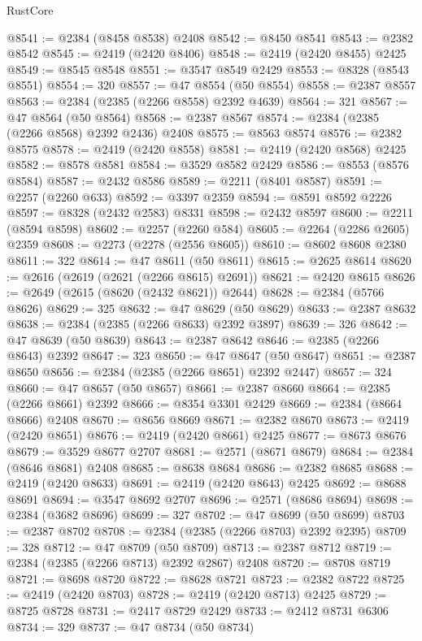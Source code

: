 \begin{lexlean}{RustCore}
\begin{coremodule}
@8541 := @2384 (@8458 @8538) @2408
@8542 := @8450 @8541
@8543 := @2382 @8542
@8545 := @2419 (@2420 @8406)
@8548 := @2419 (@2420 @8455) @2425
@8549 := @8545 @8548
@8551 := @3547 @8549 @2429
@8553 := @8328 (@8543 @8551)
@8554 := 320
@8557 := @47 @8554 (@50 @8554)
@8558 := @2387 @8557
@8563 := @2384 (@2385 (@2266 @8558) @2392 @4639)
@8564 := 321
@8567 := @47 @8564 (@50 @8564)
@8568 := @2387 @8567
@8574 := @2384 (@2385 (@2266 @8568) @2392 @2436) @2408
@8575 := @8563 @8574
@8576 := @2382 @8575
@8578 := @2419 (@2420 @8558)
@8581 := @2419 (@2420 @8568) @2425
@8582 := @8578 @8581
@8584 := @3529 @8582 @2429
@8586 := @8553 (@8576 @8584)
@8587 := @2432 @8586
@8589 := @2211 (@8401 @8587)
@8591 := @2257 (@2260 @633)
@8592 := @3397 @2359
@8594 := @8591 @8592 @2226
@8597 := @8328 (@2432 @2583) @8331
@8598 := @2432 @8597
@8600 := @2211 (@8594 @8598)
@8602 := @2257 (@2260 @584)
@8605 := @2264 (@2286 @2605) @2359
@8608 := @2273 (@2278 (@2556 @8605))
@8610 := @8602 @8608 @2380
@8611 := 322
@8614 := @47 @8611 (@50 @8611)
@8615 := @2625 @8614
@8620 := @2616 (@2619 (@2621 (@2266 @8615) @2691))
@8621 := @2420 @8615
@8626 := @2649 (@2615 (@8620 (@2432 @8621)) @2644)
@8628 := @2384 (@5766 @8626)
@8629 := 325
@8632 := @47 @8629 (@50 @8629)
@8633 := @2387 @8632
@8638 := @2384 (@2385 (@2266 @8633) @2392 @3897)
@8639 := 326
@8642 := @47 @8639 (@50 @8639)
@8643 := @2387 @8642
@8646 := @2385 (@2266 @8643) @2392
@8647 := 323
@8650 := @47 @8647 (@50 @8647)
@8651 := @2387 @8650
@8656 := @2384 (@2385 (@2266 @8651) @2392 @2447)
@8657 := 324
@8660 := @47 @8657 (@50 @8657)
@8661 := @2387 @8660
@8664 := @2385 (@2266 @8661) @2392
@8666 := @8354 @3301 @2429
@8669 := @2384 (@8664 @8666) @2408
@8670 := @8656 @8669
@8671 := @2382 @8670
@8673 := @2419 (@2420 @8651)
@8676 := @2419 (@2420 @8661) @2425
@8677 := @8673 @8676
@8679 := @3529 @8677 @2707
@8681 := @2571 (@8671 @8679)
@8684 := @2384 (@8646 @8681) @2408
@8685 := @8638 @8684
@8686 := @2382 @8685
@8688 := @2419 (@2420 @8633)
@8691 := @2419 (@2420 @8643) @2425
@8692 := @8688 @8691
@8694 := @3547 @8692 @2707
@8696 := @2571 (@8686 @8694)
@8698 := @2384 (@3682 @8696)
@8699 := 327
@8702 := @47 @8699 (@50 @8699)
@8703 := @2387 @8702
@8708 := @2384 (@2385 (@2266 @8703) @2392 @2395)
@8709 := 328
@8712 := @47 @8709 (@50 @8709)
@8713 := @2387 @8712
@8719 := @2384 (@2385 (@2266 @8713) @2392 @2867) @2408
@8720 := @8708 @8719
@8721 := @8698 @8720
@8722 := @8628 @8721
@8723 := @2382 @8722
@8725 := @2419 (@2420 @8703)
@8728 := @2419 (@2420 @8713) @2425
@8729 := @8725 @8728
@8731 := @2417 @8729 @2429
@8733 := @2412 @8731 @6306
@8734 := 329
@8737 := @47 @8734 (@50 @8734)

\end{coremodule}
\end{lexlean}
